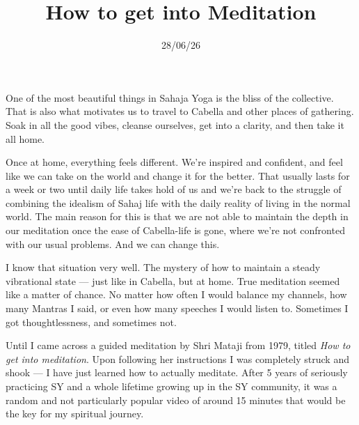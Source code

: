 \documentclass[12pt]{article}
\title{How to get into Meditation}
\date{28/06/26}
\begin{document}
\maketitle



One of the most beautiful things in Sahaja Yoga is the bliss of the collective.
That is also what motivates us to travel to Cabella and other places of gathering.
Soak in all the good vibes, cleanse ourselves, get into a clarity, and then take it all home.

Once at home, everything feels different.
We're inspired and confident, and feel like we can take on the world and change it for the better.
That usually lasts for a week or two until daily life takes hold of us and we're back to the struggle of combining the idealism of Sahaj life with the daily reality of living in the normal world.
The main reason for this is that we are not able to maintain the depth in our meditation once the ease of Cabella-life is gone, where we're not confronted with our usual problems.
And we can change this.


I know that situation very well.
The mystery of how to maintain a steady vibrational state --- just like in Cabella, but at home.
True meditation seemed like a matter of chance.
No matter how often I would balance my channels, how many Mantras I said, or even how many speeches I would listen to.
Sometimes I got thoughtlessness, and sometimes not.

Until I came across a guided meditation by Shri Mataji from 1979, titled \textit{How to get into meditation}.
Upon following her instructions I was completely struck and shook --- I have just learned how to actually meditate.
After 5 years of seriously practicing SY and a whole lifetime growing up in the SY community, it was a random and not particularly popular video of around 15 minutes that would be the key for my spiritual journey.
\end{document}
